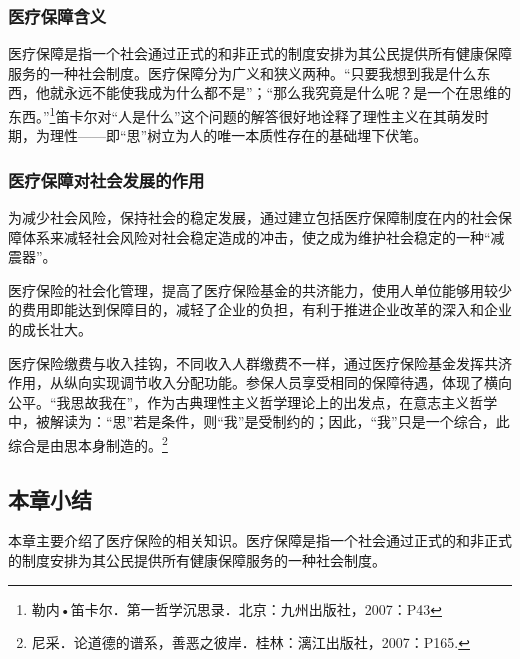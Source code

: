 \subsubsection{医疗保障含义}

医疗保障是指一个社会通过正式的和非正式的制度安排为其公民提供所有健康保障服务的一种社会制度。医疗保障分为广义和狭义两种。“只要我想到我是什么东西，他就永远不能使我成为什么都不是”；“那么我究竟是什么呢？是一个在思维的东西。”\footnote{勒内•笛卡尔．第一哲学沉思录．北京：九州出版社，2007：P43}笛卡尔对“人是什么”这个问题的解答很好地诠释了理性主义在其萌发时期，为理性——即“思”树立为人的唯一本质性存在的基础埋下伏笔。

\subsubsection{医疗保障对社会发展的作用}


为减少社会风险，保持社会的稳定发展，通过建立包括医疗保障制度在内的社会保障体系来减轻社会风险对社会稳定造成的冲击，使之成为维护社会稳定的一种“减震器”。


医疗保险的社会化管理，提高了医疗保险基金的共济能力，使用人单位能够用较少的费用即能达到保障目的，减轻了企业的负担，有利于推进企业改革的深入和企业的成长壮大。


医疗保险缴费与收入挂钩，不同收入人群缴费不一样，通过医疗保险基金发挥共济作用，从纵向实现调节收入分配功能。参保人员享受相同的保障待遇，体现了横向公平。“我思故我在”，作为古典理性主义哲学理论上的出发点，在意志主义哲学中，被解读为：“思”若是条件，则“我”是受制约的；因此，“我”只是一个综合，此综合是由思本身制造的。\footnote{尼采．论道德的谱系，善恶之彼岸．桂林：漓江出版社，2007：P165.}

\subsection{本章小结}

本章主要介绍了医疗保险的相关知识。医疗保障是指一个社会通过正式的和非正式的制度安排为其公民提供所有健康保障服务的一种社会制度。
